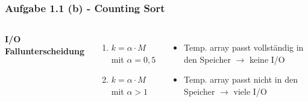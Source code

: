\documentclass[aspectratio=169]{beamer}
\begin{document}
\begin{frame}
	\frametitle{Aufgabe 1.1 (b) - Counting Sort}
	\begin{columns}[c] %
	
	\textbf{I/O Fallunterscheidung}
	\begin{enumerate}
	\item $ k = \alpha \cdot M $ mit $\alpha = 0,5$
	\item $ k = \alpha \cdot M $ mit $\alpha > 1$ \pause
	\end{enumerate}
	

	\begin{itemize}
		\item Temp. array passt vollständig in den Speicher $\rightarrow$ keine I/O \pause
		\item Temp. array passt nicht in den Speicher $\rightarrow$ viele I/O
	\end{itemize}
	
	\end{columns}
	\end{frame}
\end{document}

